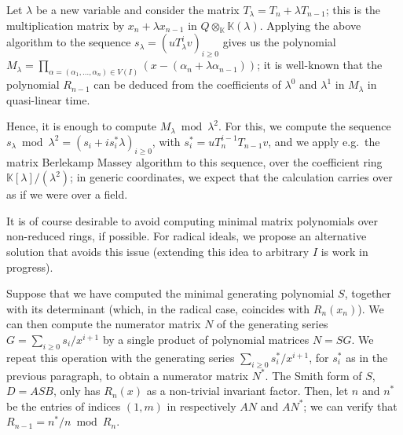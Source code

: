 \documentclass[12pt]{article}
\begin{document}
Let $\lambda$ be a new variable and consider the matrix $T_\lambda=T_n
+ \lambda T_{n-1}$; this is the multiplication matrix by $x_n +
\lambda x_{n-1}$ in $Q \otimes_{\mathbb{K}}
\mathbb{K}(\lambda)$. Applying the above algorithm to the sequence
$s_\lambda=(uT_\lambda^iv)_{i \ge 0}$ gives us the polynomial
$M_\lambda=\prod_{\alpha=(\alpha_1,\dots,\alpha_n) \in V(I)}
(x-(\alpha_n+\lambda \alpha_{n-1}))$; it is well-known that the
polynomial $R_{n-1}$ can be deduced from the coefficients of
$\lambda^0$ and $\lambda^1$ in $M_\lambda$ in quasi-linear time.

Hence, it is enough to compute $M_\lambda \bmod \lambda^2$. For this,
we compute the sequence $s_\lambda \bmod \lambda^2=(s_i + i s^*_i \lambda)_{i \ge 0}$,
with $s^*_i= uT_n^{i-1} T_{n-1}v$, and we apply e.g.\ the matrix
Berlekamp Massey algorithm to this sequence, over the coefficient ring
$\mathbb{K}[\lambda]/(\lambda^2)$; in generic coordinates, we expect that
the calculation carries over as if we were over a field.

\medskip{} It is of course desirable to 
avoid computing minimal matrix polynomials over non-reduced rings, if
possible. For radical ideals, we propose an alternative solution that
avoids this issue (extending this idea to arbitrary $I$ is work in progress).

Suppose that we have computed the minimal generating polynomial $S$,
together with its determinant (which, in the radical case, coincides with
$R_n(x_n)$). We can then compute the numerator matrix $N$ of the
generating series $G=\sum_{i \ge 0} s_i/x^{i+1}$ by a single product
of polynomial matrices $N=S G$. We repeat this operation with the
generating series $\sum_{i \ge 0} s^*_i/x^{i+1}$, for $s^*_i$ as in
the previous paragraph, to obtain a numerator matrix $N^*$. The Smith
form of $S$, $D=A S B$, only has $R_n(x)$ as a non-trivial
invariant factor. Then, let $n$ and $n^*$ be the entries of indices
$(1,m)$ in respectively $AN$ and $AN^*$; we can verify that
$R_{n-1}=n^*/n \bmod R_n$.
\end{document}
